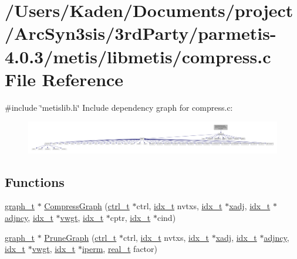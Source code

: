 \hypertarget{a00185}{}\section{/\+Users/\+Kaden/\+Documents/project/\+Arc\+Syn3sis/3rd\+Party/parmetis-\/4.0.3/metis/libmetis/compress.c File Reference}
\label{a00185}
{\ttfamily \#include \char`\"{}metislib.\+h\char`\"{}}\newline
Include dependency graph for compress.\+c\+:\nopagebreak
\begin{figure}[H]
\begin{center}
\leavevmode
\includegraphics[width=350pt]{a00186}
\end{center}
\end{figure}
\subsection*{Functions}
\begin{DoxyCompactItemize}
\item 
\hyperlink{a00734}{graph\+\_\+t} $\ast$ \hyperlink{a00185_aa4d0e5c89a60679b517deddad368b686}{Compress\+Graph} (\hyperlink{a00742}{ctrl\+\_\+t} $\ast$ctrl, \hyperlink{a00876_aaa5262be3e700770163401acb0150f52}{idx\+\_\+t} nvtxs, \hyperlink{a00876_aaa5262be3e700770163401acb0150f52}{idx\+\_\+t} $\ast$\hyperlink{a00879_aa8fc7f75458e38e1e2979ed6db639164}{xadj}, \hyperlink{a00876_aaa5262be3e700770163401acb0150f52}{idx\+\_\+t} $\ast$\hyperlink{a00879_a20c068e3ebdd8f9889fb82c1f677d679}{adjncy}, \hyperlink{a00876_aaa5262be3e700770163401acb0150f52}{idx\+\_\+t} $\ast$\hyperlink{a00879_a34203f1160d94eca83e95f2718ea3504}{vwgt}, \hyperlink{a00876_aaa5262be3e700770163401acb0150f52}{idx\+\_\+t} $\ast$cptr, \hyperlink{a00876_aaa5262be3e700770163401acb0150f52}{idx\+\_\+t} $\ast$cind)
\item 
\hyperlink{a00734}{graph\+\_\+t} $\ast$ \hyperlink{a00185_afc11099daf13e5e24f17076daf471765}{Prune\+Graph} (\hyperlink{a00742}{ctrl\+\_\+t} $\ast$ctrl, \hyperlink{a00876_aaa5262be3e700770163401acb0150f52}{idx\+\_\+t} nvtxs, \hyperlink{a00876_aaa5262be3e700770163401acb0150f52}{idx\+\_\+t} $\ast$\hyperlink{a00879_aa8fc7f75458e38e1e2979ed6db639164}{xadj}, \hyperlink{a00876_aaa5262be3e700770163401acb0150f52}{idx\+\_\+t} $\ast$\hyperlink{a00879_a20c068e3ebdd8f9889fb82c1f677d679}{adjncy}, \hyperlink{a00876_aaa5262be3e700770163401acb0150f52}{idx\+\_\+t} $\ast$\hyperlink{a00879_a34203f1160d94eca83e95f2718ea3504}{vwgt}, \hyperlink{a00876_aaa5262be3e700770163401acb0150f52}{idx\+\_\+t} $\ast$\hyperlink{a00879_a76ba0ee1ced7914ce87ac7eab1758c42}{iperm}, \hyperlink{a00876_a1924a4f6907cc3833213aba1f07fcbe9}{real\+\_\+t} factor)
\end{DoxyCompactItemize}


